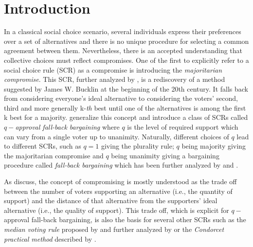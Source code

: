 \documentclass[version=3.21, pagesize, twoside=off, bibliography=totoc, DIV=calc, fontsize=12pt, a4paper]{scrartcl}
\begin{document}
\section{Introduction}
\label{sec:introduction}
In a classical social choice scenario, several individuals express their preferences over a set of alternatives and there is no unique procedure for selecting a common agreement between them. Nevertheless, there is an accepted understanding that collective choices must reflect compromises. One of the first to explicitly refer to a social choice rule (SCR) as a compromise is \cite{Sertel1986} introducing the \textit{majoritarian compromise}. This SCR, further analyzed by \cite{Sertel1999}, is a rediscovery of a method suggested by James W. Bucklin  
at the beginning of the 20th century. It falls back from considering everyone’s ideal alternative to considering the voters’ second, third and more generally k-\emph{th} best until one of the alternatives is among the first k best for a majority. \cite{Brams2001} generalize this concept and introduce a class of SCRs called $q-$\textit{approval fall-back bargaining }where $q$ is the level of required support which can vary from a single voter up to unanimity. Naturally, different choices of $q$ lead to different SCRs, such as $q=1$ giving the plurality rule; $q$ being majority giving the majoritarian compromise and $q$ being unanimity giving a bargaining procedure called \textit{fall-back bargaining} which has been further analyzed by \cite{Kibris2007} and \cite{Congar2012}. 

As \cite{OezkalSanver2004} discuss, the concept of compromising is mostly understood as the trade off between the number of voters supporting an alternative (i.e., the quantity of support) and the distance of that alternative from the supporters' ideal alternative (i.e., the quality of support). This trade off, which is explicit for $q-$approval fall-back bargaining, is also the basis for several other SCRs such as the \textit{median voting rule} proposed by \cite{Bassett1999} and further analyzed by \cite{Gehrlein2003} or the \textit{Condorcet practical method }described by \cite{Nurmi1999}.
\end{document}
